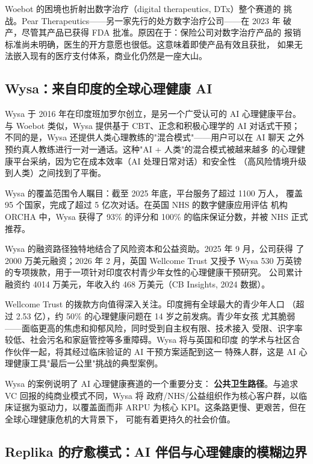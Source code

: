 Woebot 的困境也折射出数字治疗（digital therapeutics, DTx）整个赛道的
挑战。Pear Therapeutics——另一家先行的处方数字治疗公司——在 2023 年
破产，尽管其产品已获得 FDA 批准。原因在于：保险公司对数字治疗产品的
报销标准尚未明确，医生的开方意愿也很低。这意味着即使产品有效且获批，
如果无法嵌入现有的医疗支付体系，商业化仍然是一座大山。


\subsection{Wysa：来自印度的全球心理健康 AI}
\label{subsec:wysa}

Wysa 于 2016 年在印度班加罗尔创立，是另一个广受认可的 AI 心理健康平台。
与 Woebot 类似，Wysa 提供基于 CBT、正念和积极心理学的 AI 对话式干预；
不同的是，Wysa 还提供人类心理教练的"混合模式"——用户可以在 AI 聊天
之外预约真人教练进行一对一通话。这种"AI + 人类"的混合模式被越来越多
的心理健康平台采纳，因为它在成本效率（AI 处理日常对话）和安全性
（高风险情境升级到人类）之间找到了平衡。

Wysa 的覆盖范围令人瞩目：截至 2025 年底，平台服务了超过 1100 万人，
覆盖 95 个国家，完成了超过 5 亿次对话。在英国 NHS 的数字健康应用评估
机构 ORCHA 中，Wysa 获得了 93\% 的评分和 100\% 的临床保证分数，并被
NHS 正式推荐。

Wysa 的融资路径独特地结合了风险资本和公益资助。2025 年 9 月，公司获得
了 2000 万美元融资；2026 年 2 月，英国 Wellcome Trust 又授予 Wysa 530
万英镑的专项拨款，用于一项针对印度农村青少年女性的心理健康干预研究。
公司累计融资约 4014 万美元，年收入约 468 万美元（CB Insights, 2024
数据）。

Wellcome Trust 的拨款方向值得深入关注。印度拥有全球最大的青少年人口
（超过 2.53 亿），约 50\% 的心理健康问题在 14 岁之前发病。青少年女孩
尤其脆弱——面临更高的焦虑和抑郁风险，同时受到自主权有限、技术接入
受限、识字率较低、社会污名和家庭管控等多重障碍。Wysa 将与英国和印度
的学术与社区合作伙伴一起，将其经过临床验证的 AI 干预方案适配到这一
特殊人群，这是 AI 心理健康工具"最后一公里"挑战的典型案例。

Wysa 的案例说明了 AI 心理健康赛道的一个重要分支：
\textbf{公共卫生路径}。与追求 VC 回报的纯商业模式不同，Wysa 将
政府/NHS/公益组织作为核心客户群，以临床证据为驱动力，以覆盖面而非
ARPU 为核心 KPI。这条路更慢、更艰苦，但在全球心理健康危机的大背景下，
可能有着更持久的社会价值。


\subsection{Replika 的疗愈模式：AI 伴侣与心理健康的模糊边界}
\label{subsec:replika-therapy}

